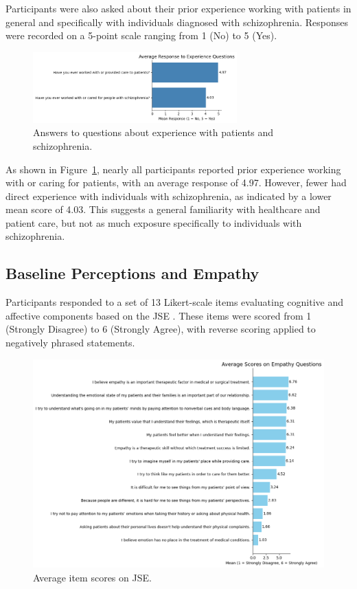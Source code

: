 Participants were also asked about their prior experience working with patients in general and specifically with individuals diagnosed with schizophrenia. Responses were recorded on a 5-point scale ranging from 1 (No) to 5 (Yes).

\begin{figure}[H]
    \centering
    \includegraphics[width=0.7\textwidth]{../../Figures/experience-patients.png}
    \caption{Answers to questions about experience with patients and schizophrenia.}
    \label{fig:experience_patients}
\end{figure}

As shown in Figure~\ref{fig:experience_patients}, nearly all participants reported prior experience working with or caring for patients, with an average response of 4.97. However, fewer had direct experience with individuals with schizophrenia, as indicated by a lower mean score of 4.03. This suggests a general familiarity with healthcare and patient care, but not as much exposure specifically to individuals with schizophrenia.

\subsection{Baseline Perceptions and Empathy}

Participants responded to a set of 13 Likert-scale items evaluating cognitive and affective components based on the JSE \cite{Hojat2002}. These items were scored from 1 (Strongly Disagree) to 6 (Strongly Agree), with reverse scoring applied to negatively phrased statements.

\begin{figure}[H]
    \centering
    \includegraphics[width=\columnwidth]{../../Figures/avg-scores-pre.png}
    \caption{Average item scores on JSE.}
    \label{fig:avg_scores_pre}
\end{figure}

